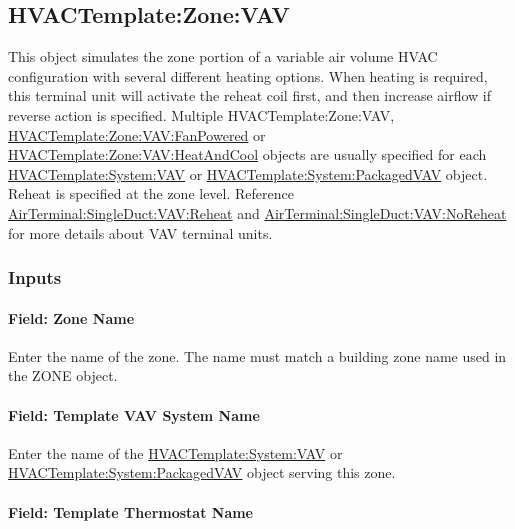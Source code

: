 \subsection{HVACTemplate:Zone:VAV}\label{hvactemplatezonevav}

This object simulates the zone portion of a variable air volume HVAC configuration with several different heating options. When heating is required, this terminal unit will activate the reheat coil first, and then increase airflow if reverse action is specified. Multiple HVACTemplate:Zone:VAV, \hyperref[hvactemplatezonevavfanpowered]{HVACTemplate:Zone:VAV:FanPowered} or \hyperref[hvactemplatezonevavheatandcool]{HVACTemplate:Zone:VAV:HeatAndCool} objects are usually specified for each \hyperref[hvactemplatesystemvav]{HVACTemplate:System:VAV} or \hyperref[hvactemplatesystempackagedvav]{HVACTemplate:System:PackagedVAV} object. Reheat is specified at the zone level. Reference \hyperref[airterminalsingleductvavreheat]{AirTerminal:SingleDuct:VAV:Reheat} and \hyperref[airterminalsingleductvavnoreheat]{AirTerminal:SingleDuct:VAV:NoReheat} for more details about VAV terminal units.

\subsubsection{Inputs}\label{inputs-9-008}

\paragraph{Field: Zone Name}\label{field-zone-name-8-001}

Enter the name of the zone. The name must match a building zone name used in the ZONE object.

\paragraph{Field: Template VAV System Name}\label{field-template-vav-system-name}

Enter the name of the \hyperref[hvactemplatesystemvav]{HVACTemplate:System:VAV} or \hyperref[hvactemplatesystempackagedvav]{HVACTemplate:System:PackagedVAV} object serving this zone.

\paragraph{Field: Template Thermostat Name}\label{field-template-thermostat-name-8}

